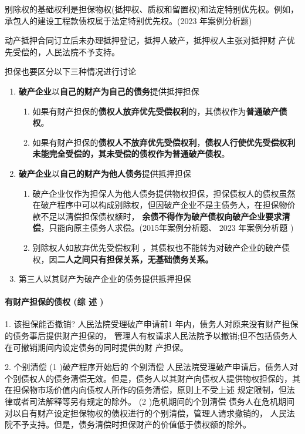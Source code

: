 \documentclass[UTF8,12pt]{ctexart}
\numberwithin{equation}{section} %
\numberwithin{figure}{section}
\numberwithin{table}{section}
\begin{document}
	别除权的基础权利是担保物权(抵押权、质权和留置权)和法定特别优先权。例如，承包人的建设工程款债权属于法定特别优先权。(2023 年案例分析题) 
	
	动产抵押合同订立后未办理抵押登记，抵押人破产，抵押权人主张对抵押财 产优先受偿的，人民法院不予支持。
	
	担保也要区分以下三种情况进行讨论
	\begin{enumerate}
		\item \textbf{破产企业}以\textbf{自己的财产为自己的债务}提供抵押担保
		\begin{enumerate}
			\item 如果有财产担保的\textbf{债权人放弃优先受偿权利}的，其债权作为\textbf{普通破产债权}。 
			
			\item 如果有财产担保的\textbf{债权人不放弃优先受偿权利}，\textbf{债权人行使优先受偿权利未能完全受偿的，其未受偿的债权作为普通破产债权}。
		\end{enumerate}

		\item \textbf{破产企业}以\textbf{自己的财产为他人债务}提供抵押担保
		\begin{enumerate}
			\item 破产企业仅作为担保人为他人债务提供物权担保，担保债权人的债权虽然在破产程序中可以构成别除权，但因破产企业不是主债务人，在担保物价款不足以清偿担保债权额时， \textbf{余债不得作为破产债权向破产企业要求清偿}，只能向原主债务人求偿。(2015年案例分析题、 2023 年案例分析题 )
			
			\item 别除权人如放弃优先受偿权利 ，其债权也不能转为对破产企业的破产债权，因\textbf{二人之间只有担保关系，无基础债务关系。}
		\end{enumerate}

		
		\item 第三人以其财产为破产企业的债务提供抵押担保
	\end{enumerate}
	
		
	\paragraph{有财产担保的债权 (综 述 )}
	1. 该担保能否撤销?
	人民法院受理破产申请前1 年内，债务人对原来没有财产担保的债务事后提供财产担保的， 管理人有权请求人民法院予以撤销;但不包括债务人在可撤销期间内设定债务的同时提供的财 产担保。
	
	2. 个别清偿
	(1 )破产程序开始后的 个别清偿
	人民法院受理破产申请后，债务人对个别债权人的债务清偿无效。但是，债务人以其财产向债权人提供物权担保的，其在担保物市场价值内向债权人所作的债务清偿，原则上不受上述 规定限制，但法律或者司法解释等另有规定的除外。
	(2 )危机期间的个别清偿 债务人在危机期间对以自有财产设定担保物权的债权进行的个别清偿，管理人请求撤销的， 人民法院不予支持。但是，债务清偿时担保财产的价值低于债权额的除外。
	
\end{document}
